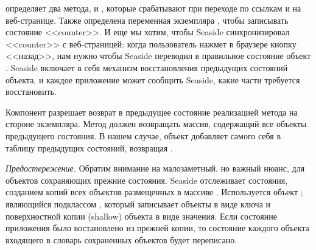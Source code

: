 \documentclass[a4paper,10pt,twoside]{book}
\begin{document}
 определяет два метода,  и ,
которые срабатывают при переходе по ссылкам \link{++} и \link{--\,--}
на веб-странице.
Также определена переменная экземпляра ,
чтобы записывать состояние <<counter>>.
И еще мы хотим, чтобы Seaside синхронизировал <<counter>>
с веб-страницей: когда пользователь нажмет в браузере кнопку <<назад>>,
нам нужно чтобы Seaside переводил в правильное состояние
объект .
Seaside включает в себя механизм восстановления предыдущих
состояний объекта, и каждое приложение может сообщить Seaside,
какие части требуется восстановить.


Компонент разрешает возврат в предыдущее состояние реализацией
метода  на стороне экземпляра.
Метод  должен возвращать массив,
содержащий все объекты предыдущего состояния. В нашем случае,
объект  добавляет самого себя в таблицу предыдущих
состояний, возвращая .


\emph{Предостережение.}
Обратим внимание на малозаметный, но важный нюанс,
для объектов сохраняющих прежние состояния.
Seaside отслеживает состояния, созданием копий всех объектов размещенных в массиве .
Используется объект ; являющийся подклассом ,
который записывает объекты в виде ключа и поверхностной копии (shallow) объекта в виде значения.
Если состояние приложения было востановлено из прежней копии,
то состояние каждого объекта входящего в словарь сохраненных объектов
будет переписано.
\end{document}
